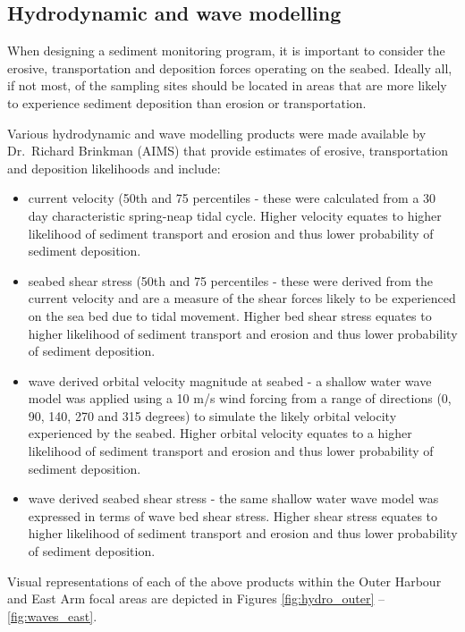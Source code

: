 \documentclass[a4paper]{article}
\begin{document}
\newpage

\hypertarget{hydrodynamic-and-wave-modelling}{%
\subsection{Hydrodynamic and wave
modelling}\label{hydrodynamic-and-wave-modelling}}

When designing a sediment monitoring program, it is important to
consider the erosive, transportation and deposition forces operating on
the seabed. Ideally all, if not most, of the sampling sites should be
located in areas that are more likely to experience sediment deposition
than erosion or transportation.

Various hydrodynamic and wave modelling products were made available by
Dr.~Richard Brinkman (AIMS) that provide estimates of erosive,
transportation and deposition likelihoods and include:

\begin{itemize}
\tightlist
\item
  current velocity (50th and 75 percentiles - these were calculated from
  a 30 day characteristic spring-neap tidal cycle. Higher velocity
  equates to higher likelihood of sediment transport and erosion and
  thus lower probability of sediment deposition.
\item
  seabed shear stress (50th and 75 percentiles - these were derived from
  the current velocity and are a measure of the shear forces likely to
  be experienced on the sea bed due to tidal movement. Higher bed shear
  stress equates to higher likelihood of sediment transport and erosion
  and thus lower probability of sediment deposition.
\item
  wave derived orbital velocity magnitude at seabed - a shallow water
  wave model was applied using a 10 m/s wind forcing from a range of
  directions (0, 90, 140, 270 and 315 degrees) to simulate the likely
  orbital velocity experienced by the seabed. Higher orbital velocity
  equates to a higher likelihood of sediment transport and erosion and
  thus lower probability of sediment deposition.
\item
  wave derived seabed shear stress - the same shallow water wave model
  was expressed in terms of wave bed shear stress. Higher shear stress
  equates to higher likelihood of sediment transport and erosion and
  thus lower probability of sediment deposition.
\end{itemize}

Visual representations of each of the above products within the Outer
Harbour and East Arm focal areas are depicted in Figures
\ref{fig:hydro_outer} -- \ref{fig:waves_east}.
\end{document}
